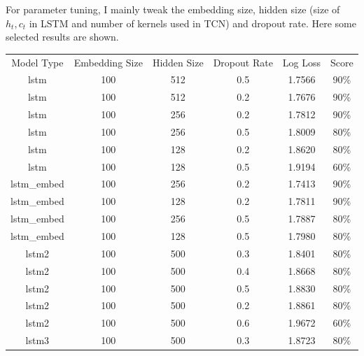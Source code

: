 \documentclass[12pt]{article}
\begin{document}
For parameter tuning, I mainly tweak the embedding size, hidden size (size of \(h_t, c_t\) in LSTM and number of kernels used in TCN) and dropout rate. Here some selected results are shown.

\begin{longtable}[c]{@{}>{\ttfamily}cccccc@{}}
	\toprule
	\textrm{Model Type}  & Embedding Size & Hidden Size & Dropout Rate & Log Loss & Score \\*
	\midrule
	\endhead
	\bottomrule
	\endfoot
	\endlastfoot
	lstm                 & 100            & 512         & 0.5          & 1.7566   & 90\%  \\
	lstm                 & 100            & 512         & 0.2          & 1.7676   & 90\%  \\
	lstm                 & 100            & 256         & 0.2          & 1.7812   & 90\%  \\
	lstm                 & 100            & 256         & 0.5          & 1.8009   & 80\%  \\
	lstm                 & 100            & 128         & 0.2          & 1.8620   & 80\%  \\
	lstm                 & 100            & 128         & 0.5          & 1.9194   & 60\%  \\\midrule
	lstm\_embed          & 100            & 256         & 0.2          & 1.7413   & 90\%  \\
	lstm\_embed          & 100            & 128         & 0.2          & 1.7811   & 90\%  \\
	lstm\_embed          & 100            & 256         & 0.5          & 1.7887   & 80\%  \\
	lstm\_embed          & 100            & 128         & 0.5          & 1.7980   & 80\%  \\\midrule
	lstm2                & 100            & 500         & 0.3          & 1.8401   & 80\%  \\
	lstm2                & 100            & 500         & 0.4          & 1.8668   & 80\%  \\
	lstm2                & 100            & 500         & 0.5          & 1.8830   & 80\%  \\
	lstm2                & 100            & 500         & 0.2          & 1.8861   & 80\%  \\
	lstm2                & 100            & 500         & 0.6          & 1.9672   & 60\%  \\\midrule
	lstm3                & 100            & 500         & 0.3          & 1.8723   & 80\%  \\

\end{longtable}
\end{document}
